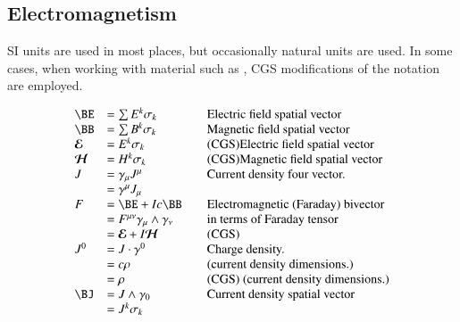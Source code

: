 \subsection{Electromagnetism}

SI units are
used in most places, but occasionally natural units are used.  In
some cases, when working with material such as \cite{bohm1989qt},
CGS modifications of the notation are employed.

\begin{equation*}
\begin{array}{l l l}
\BE &= \sum E^k \sigma_k & \quad \mbox{Electric field spatial vector} \\
\BB &= \sum B^k \sigma_k & \quad \mbox{Magnetic field spatial vector} \\
\EE &= E^k \sigma_k & \quad \mbox{(CGS)Electric field spatial vector} \\
\HH &= H^k \sigma_k & \quad \mbox{(CGS)Magnetic field spatial vector} \\
J &= \gamma_{\mu} J^{\mu} & \quad \mbox{Current density four vector.} \\
  &= \gamma^{\mu} J_{\mu} \\
F &= \BE + I c \BB & \quad \mbox{Electromagnetic (Faraday) bivector} \\
  &= F^{\mu\nu} \gamma_\mu \wedge \gamma_\nu & \quad \mbox{in terms of Faraday tensor} \\
  &= \EE + I \HH & \quad \mbox{(CGS)} \\
J^{0} &= J \cdot \gamma^0 & \quad \mbox{Charge density.} \\
      &= c \rho & \quad \mbox{(current density dimensions.)} \\
      &= \rho & \quad \mbox{(CGS) (current density dimensions.)} \\
\BJ &= J \wedge \gamma_0 & \quad \mbox{Current density spatial vector} \\
    &= J^k \sigma_k \\
\end{array}
\end{equation*}

